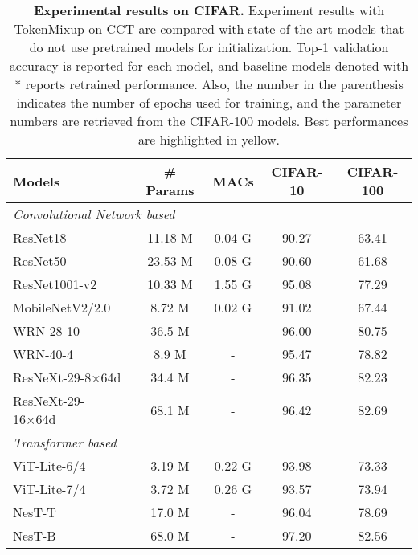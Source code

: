 \documentclass{article}
\begin{document}
\begin{table}[t]
    \centering
    \setlength{\tabcolsep}{3.5pt}
    \caption{\footnotesize \textbf{Experimental results on CIFAR.} Experiment results with TokenMixup on CCT are compared with state-of-the-art models that do not use pretrained models for initialization. Top-1 validation accuracy is reported for each model, and baseline models denoted with * reports retrained performance. Also, the number in the parenthesis indicates the number of epochs used for training, and the parameter numbers are retrieved from the CIFAR-100 models. Best performances are highlighted in yellow.}
    \begin{adjustbox}{width=0.9\textwidth}
    \begin{tabular}{l@{\hskip 0.2in} |@{\hskip 0.1in} c c@{\hskip 0.1in} |@{\hskip 0.1in} c@{\hskip 0.1in} c@{\hskip 0.1in}}
        \toprule
        \textbf{Models} & \textbf{\# Params} & \textbf{MACs} & \textbf{CIFAR-10} & \textbf{CIFAR-100}  \\
        \midrule
        \midrule
        \multicolumn{5}{l}{\textit{Convolutional Network based}} \\ 
        \midrule
        ResNet18 & 11.18 M & 0.04 G & 90.27 & 63.41 \\
ResNet50 & 23.53 M & 0.08 G & 90.60 & 61.68 \\
        ResNet1001-v2~\cite{he2016identity} & 10.33 M & 1.55 G & 95.08 & 77.29 \\
        MobileNetV2/2.0~\cite{sandler2018mobilenetv2} & 8.72 M & 0.02 G & 91.02  & 67.44 \\
        WRN-28-10~\cite{zagoruyko2016wide} & 36.5 M & - & 96.00 & 80.75 \\
        WRN-40-4~\cite{zagoruyko2016wide} & 8.9 M & - & 95.47 & 78.82 \\
        ResNeXt-29-8×64d~\cite{xie2017aggregated} & 34.4 M & - & 96.35 & 82.23 \\
        ResNeXt-29-16×64d~\cite{xie2017aggregated} & 68.1 M & - & 96.42 & 82.69 \\
        \midrule
        \multicolumn{5}{l}{\textit{Transformer based}} \\ 
        \midrule
ViT-Lite-6/4~\cite{hassani2021escaping}  & 3.19 M & 0.22 G & 93.98 & 73.33 \\
        ViT-Lite-7/4~\cite{hassani2021escaping}  & 3.72 M & 0.26 G & 93.57 & 73.94 \\
        NesT-T~\cite{zhang2022nested} & 17.0 M & - & 96.04 & 78.69 \\
        NesT-B~\cite{zhang2022nested} & 68.0 M & - & 97.20 & 82.56 \\

\end{tabular}
\end{adjustbox}
\end{table}
\end{document}
